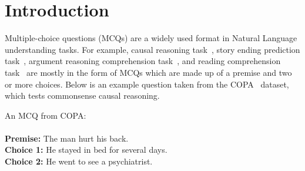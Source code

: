 \section{Introduction}
\label{sec:intro}

Multiple-choice questions (MCQs) are a widely used format  
in Natural Language understanding tasks. 
For example, causal reasoning task~\cite{copa2012}, story ending prediction task~\cite{roc2017},
argument reasoning comprehension task~\cite{arct2018}, and reading comprehension task~\cite{yu2020reclor}
are mostly in the form of MCQs which are made up of a premise and 
two or more choices. Below is an example question taken 
from the COPA~\cite{copa2012} dataset, which tests commonsense causal 
reasoning.

\begin{example}\label{ex:copa}
An MCQ from COPA:\\ \\
\noindent
\textbf{Premise:} The man hurt his back.\\
\textbf{Choice 1:} He stayed in bed for several days.  \checksymbol \\
\textbf{Choice 2:} He went to see a psychiatrist. \crosssymbol 
\end{example}

